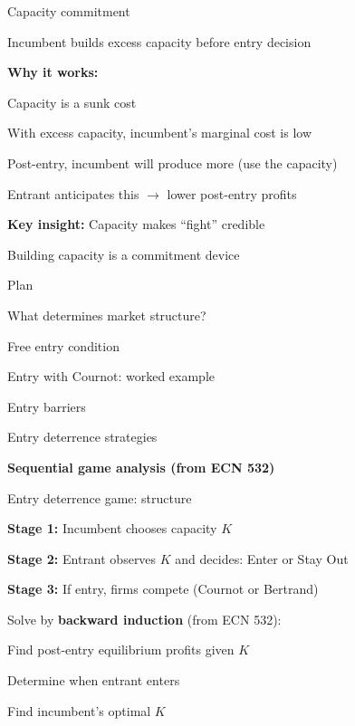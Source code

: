 \documentclass[notes,11pt, aspectratio=169]{beamer}
\newenvironment{wideitemize}{\itemize\addtolength{\itemsep}{10pt}}{\enditemize}
\newenvironment{wideenumerate}{\enumerate\addtolength{\itemsep}{10pt}}{\endenumerate}
\begin{document}
\begin{frame}{Capacity commitment}
	\begin{wideitemize}
		\item Incumbent builds excess capacity before entry decision
		\item \textbf{Why it works:}
		\begin{wideitemize}
			\vspace{5pt}
			\item Capacity is a sunk cost
			\item With excess capacity, incumbent's marginal cost is low
			\item Post-entry, incumbent will produce more (use the capacity)
			\item Entrant anticipates this $\rightarrow$ lower post-entry profits
		\end{wideitemize}
		\item \textbf{Key insight:} Capacity makes ``fight'' credible
		\item Building capacity is a commitment device
	\end{wideitemize}
\end{frame}

\begin{frame}{Plan}
  \begin{wideenumerate}
    \item What determines market structure?
    \item Free entry condition
    \item Entry with Cournot: worked example
    \item Entry barriers
    \item Entry deterrence strategies
    \item \textbf{Sequential game analysis (from ECN 532)}
  \end{wideenumerate}
\end{frame}

\begin{frame}{Entry deterrence game: structure}
	\begin{wideitemize}
		\item \textbf{Stage 1:} Incumbent chooses capacity $K$
		\item \textbf{Stage 2:} Entrant observes $K$ and decides: Enter or Stay Out
		\item \textbf{Stage 3:} If entry, firms compete (Cournot or Bertrand)
		\item Solve by \textbf{backward induction} (from ECN 532):
		\begin{wideenumerate}
			\vspace{5pt}
			\item Find post-entry equilibrium profits given $K$
			\item Determine when entrant enters
			\item Find incumbent's optimal $K$
		\end{wideenumerate}
	\end{wideitemize}
\end{frame}
\end{document}
